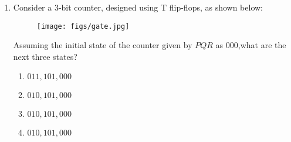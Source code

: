 \documentclass[12pt,-letter paper]{article}
\begin{document}
\begin{enumerate}
\item Consider a $3$-bit counter, designed using T flip-flops, as shown below:
     \begin{figure}[H]
\centering
\texttt{[image: figs/gate.jpg]}
\caption{}
\label{fig:gate.jpg}
\end{figure}
Assuming the initial state of the counter given by $PQR$ as $000$,what are the next three states?
\begin{enumerate}[label=(\Alph*)]
\item $011, 101, 000$
\item $010, 101, 000$
\item $010, 101, 000$
\item $010, 101, 000$
\end{enumerate}
\end{enumerate}
\end{document}
